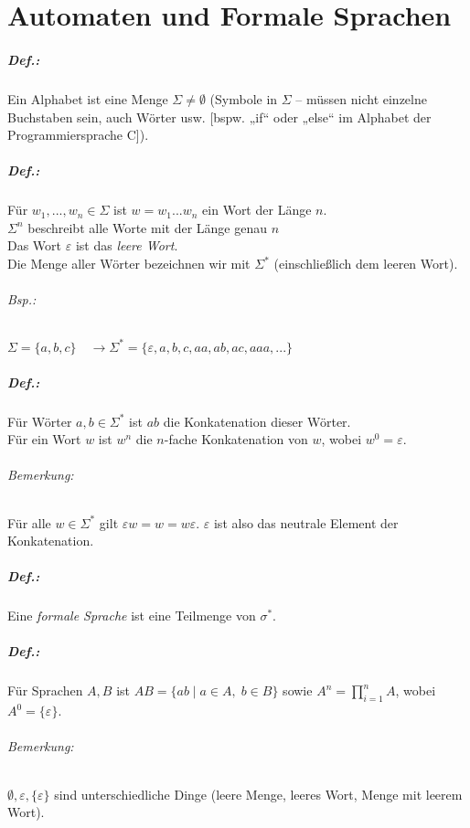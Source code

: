 \chapter{Automaten und Formale Sprachen}
\paragraph{Def.:} Ein Alphabet ist eine Menge $\Sigma \not = \emptyset$ (Symbole in $\Sigma$ -- müssen nicht einzelne Buchstaben sein, auch Wörter usw. [bspw. „if“ oder „else“ im Alphabet der Programmiersprache C]).

\paragraph{Def.:} Für $w_1, ..., w_n \in \Sigma$ ist $w=w_1...w_n$ ein Wort der Länge $n$.\\
$\Sigma^n$ beschreibt alle Worte mit der Länge genau $n$\\
Das Wort $\varepsilon$ ist das \emph{leere Wort}.\\
Die Menge aller Wörter bezeichnen wir mit $\Sigma^*$ (einschließlich dem leeren Wort).

\subparagraph{Bsp.:} $\Sigma = \{a,b,c\}\quad \rightarrow \Sigma^*=\{\varepsilon, a, b, c, aa, ab,a c, aaa, ...\}$
\paragraph{Def.:} Für Wörter $a,b \in \Sigma^*$ ist $ab$ die Konkatenation dieser Wörter.\\
Für ein Wort $w$ ist $w^n$ die $n$-fache Konkatenation von $w$, wobei $w^0=\varepsilon$.

\subparagraph{Bemerkung:} Für alle $w \in \Sigma^*$ gilt $\varepsilon w = w = w \varepsilon$. $\varepsilon$ ist also das neutrale Element der Konkatenation.

\paragraph{Def.:} Eine \emph{formale Sprache} ist eine Teilmenge von $\sigma^*$.

\paragraph{Def.:} Für Sprachen $A, B$ ist $AB=\{ab \;|\; a \in A, \; b \in B\}$ sowie $A^n=\prod_{i=1}^{n}A$, wobei $A^0=\{\varepsilon\}$.
\subparagraph{Bemerkung:} $\emptyset, \varepsilon, \{\varepsilon\}$ sind unterschiedliche Dinge (leere Menge, leeres Wort, Menge mit leerem Wort).

